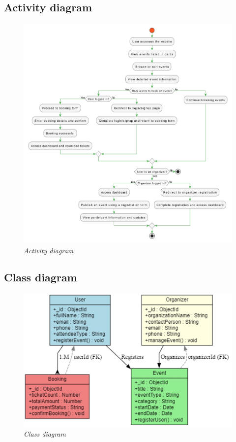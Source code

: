 \documentclass[twoside,a4paper,openright]{report} %
\begin{document}
\subsection{Activity diagram}
\begin{figure}[H]
	\centering
	\includegraphics[scale=0.60]{activity.jpg}   
	\vspace{48pt}  %
	\caption{\textit{Activity diagram}}
		\vspace{48pt}
	\label{fig:activity-diagram}
\end{figure}

\subsection{Class diagram}
\begin{figure}[H]
	\centering
	\includegraphics[scale=0.50]{class.jpg}   
	\caption{\textit{Class diagram}}
	\label{fig:class-diagram}
\end{figure}
\iffalse
\end{document}
